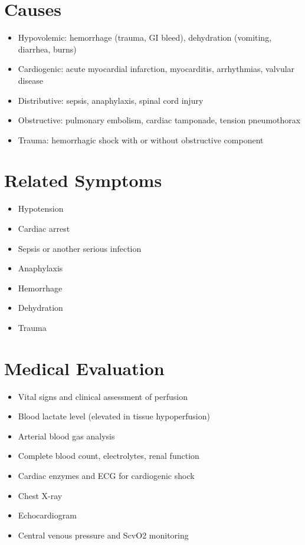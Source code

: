\section*{Causes}
\begin{itemize}
\item Hypovolemic: hemorrhage (trauma, GI bleed), dehydration (vomiting, diarrhea, burns)
\item Cardiogenic: acute myocardial infarction, myocarditis, arrhythmias, valvular disease
\item Distributive: sepsis, anaphylaxis, spinal cord injury
\item Obstructive: pulmonary embolism, cardiac tamponade, tension pneumothorax
\item Trauma: hemorrhagic shock with or without obstructive component
\end{itemize}

\section*{Related Symptoms}
\begin{itemize}
\item Hypotension
\item Cardiac arrest
\item Sepsis or another serious infection
\item Anaphylaxis
\item Hemorrhage
\item Dehydration
\item Trauma
\end{itemize}

\section*{Medical Evaluation}
\begin{itemize}
\item Vital signs and clinical assessment of perfusion
\item Blood lactate level (elevated in tissue hypoperfusion)
\item Arterial blood gas analysis
\item Complete blood count, electrolytes, renal function
\item Cardiac enzymes and ECG for cardiogenic shock
\item Chest X-ray
\item Echocardiogram
\item Central venous pressure and ScvO2 monitoring
\end{itemize}

